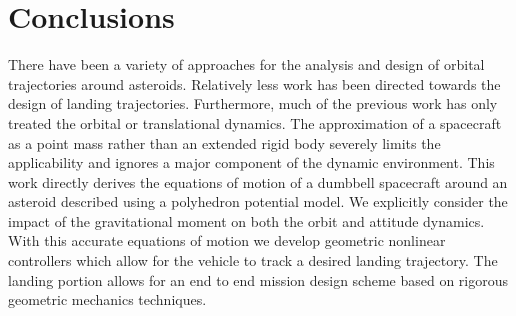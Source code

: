 \documentclass[letterpaper, paper,11pt]{AAS}		%
\begin{document}
\section{Conclusions}\label{sec:conclusions}
There have been a variety of approaches for the analysis and design of orbital trajectories around asteroids.
Relatively less work has been directed towards the design of landing trajectories.
Furthermore, much of the previous work has only treated the orbital or translational dynamics.
The approximation of a spacecraft as a point mass rather than an extended rigid body severely limits the applicability and ignores a major component of the dynamic environment.
This work directly derives the equations of motion of a dumbbell spacecraft around an asteroid described using a polyhedron potential model. 
We explicitly consider the impact of the gravitational moment on both the orbit and attitude dynamics. 
With this accurate equations of motion we develop geometric nonlinear controllers which allow for the vehicle to track a desired landing trajectory. 
The landing portion allows for an end to end mission design scheme based on rigorous geometric mechanics techniques.

 
% 

\end{document}
